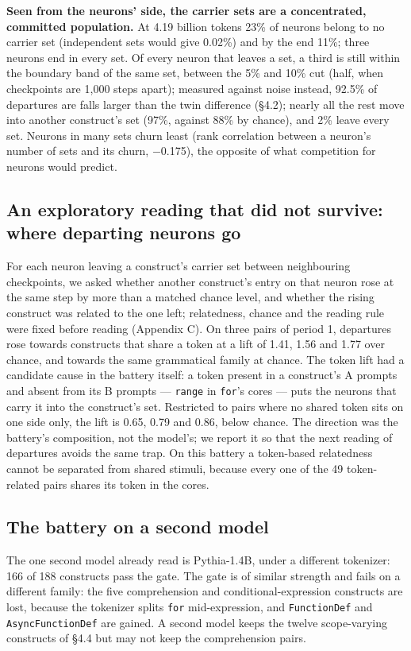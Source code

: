 \documentclass{article}
\begin{document}
\textbf{Seen from the neurons' side, the carrier sets are a concentrated, committed population.} At 4.19 billion tokens 23\% of neurons belong to no carrier set (independent sets would give 0.02\%) and by the end 11\%; three neurons end in every set. Of every neuron that leaves a set, a third is still within the boundary band of the same set, between the 5\% and 10\% cut (half, when checkpoints are 1,000 steps apart); measured against noise instead, 92.5\% of departures are falls larger than the twin difference (\S4.2); nearly all the rest move into another construct's set (97\%, against 88\% by chance), and 2\% leave every set. Neurons in many sets churn least (rank correlation between a neuron's number of sets and its churn, $-$0.175), the opposite of what competition for neurons would predict.

\subsection{An exploratory reading that did not survive: where departing neurons go}

For each neuron leaving a construct's carrier set between neighbouring checkpoints, we asked whether another construct's entry on that neuron rose at the same step by more than a matched chance level, and whether the rising construct was related to the one left; relatedness, chance and the reading rule were fixed before reading (Appendix C). On three pairs of period 1, departures rose towards constructs that share a token at a lift of 1.41, 1.56 and 1.77 over chance, and towards the same grammatical family at chance. The token lift had a candidate cause in the battery itself: a token present in a construct's A prompts and absent from its B prompts --- \texttt{range} in \texttt{for}'s cores --- puts the neurons that carry it into the construct's set. Restricted to pairs where no shared token sits on one side only, the lift is 0.65, 0.79 and 0.86, below chance. The direction was the battery's composition, not the model's; we report it so that the next reading of departures avoids the same trap. On this battery a token-based relatedness cannot be separated from shared stimuli, because every one of the 49 token-related pairs shares its token in the cores.

\subsection{The battery on a second model}

The one second model already read is Pythia-1.4B, under a different tokenizer: 166 of 188 constructs pass the gate. The gate is of similar strength and fails on a different family: the five comprehension and conditional-expression constructs are lost, because the tokenizer splits \texttt{for} mid-expression, and \texttt{FunctionDef} and \texttt{AsyncFunctionDef} are gained. A second model keeps the twelve scope-varying constructs of \S4.4 but may not keep the comprehension pairs.
\end{document}
